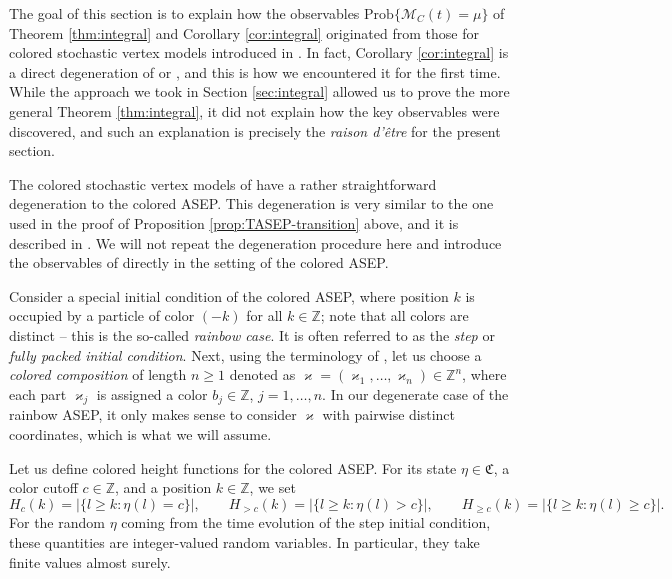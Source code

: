 \documentclass[11pt,reqno]{amsart}
\theoremstyle{definition}
\theoremstyle{remark}
\theoremstyle{remark}
\def\geq{\geqslant}
\renewcommand\ge{\geq}
\def\Z{\mathbb Z}
\def\M{\mathcal M}
\numberwithin{equation}{section}
\begin{document}
	The goal of this section is to explain how the observables $\mathrm{Prob}\{\M_C(t)=\mu\}$ of Theorem \ref{thm:integral} and Corollary \ref{cor:integral} originated from those for colored stochastic vertex models introduced in \cite{BW-observables}. In fact, Corollary \ref{cor:integral} is a direct degeneration of \cite[Theorem 1.1]{BW-observables} or \cite[Corollary 8.4]{Bufetov-Korotkikh}, and this is how we encountered it for the first time. While the approach we took in Section \ref{sec:integral} allowed us to prove the more general Theorem \ref{thm:integral}, it did not explain how the key observables were discovered, and such an explanation is precisely the {\it raison d'\^{e}tre} for the present section.  
	
	The colored stochastic vertex models of \cite{BW-observables} have a rather straightforward degeneration to the colored ASEP. This degeneration is very similar to the one used in the proof of Proposition \ref{prop:TASEP-transition} above, and it is described in \cite[Section 12.3.2]{BW-coloured}. We will not repeat the degeneration procedure here and introduce the observables of \cite{BW-observables} directly in the setting of the colored ASEP. 
	
	Consider a special initial condition of the colored ASEP, where position $k$ is occupied by a particle of color $(-k)$ for all $k\in\Z$; note that all colors are distinct -- this is the so-called \emph{rainbow case}. It is often referred to as the \emph{step} or \emph{fully packed initial condition}. Next, using the terminology of \cite{BW-observables}, let us choose a \emph{colored composition} of length $n\ge 1$ denoted as $\varkappa=(\varkappa_1,\dots,\varkappa_n)\in\Z^n$, where each part $\varkappa_j$ is assigned a color $b_j\in\Z$, $j=1,\dots,n$. In our degenerate case of the rainbow ASEP, it only makes sense to consider $\varkappa$ with pairwise distinct coordinates, which is what we will assume. 
	
	Let us define colored height functions for the colored ASEP. For its state $\eta\in\mathfrak C$, a color cutoff $c\in\Z$, and a position $k\in\Z$, 
	we set 
	\begin{equation}
		\label{eq:height-function}
		H_c(k)=|\{l\ge k:\eta(l)=c\}|, \qquad H_{>c}(k)=|\{l\ge k:\eta(l)>c\}|,  \qquad H_{\ge c}(k)=|\{l\ge k:\eta(l)\ge c\}|.
	\end{equation}
	For the random $\eta$ coming from the time evolution of the step initial condition, these quantities are integer-valued random variables. In particular, they take finite values almost surely. 
	
\end{document}
